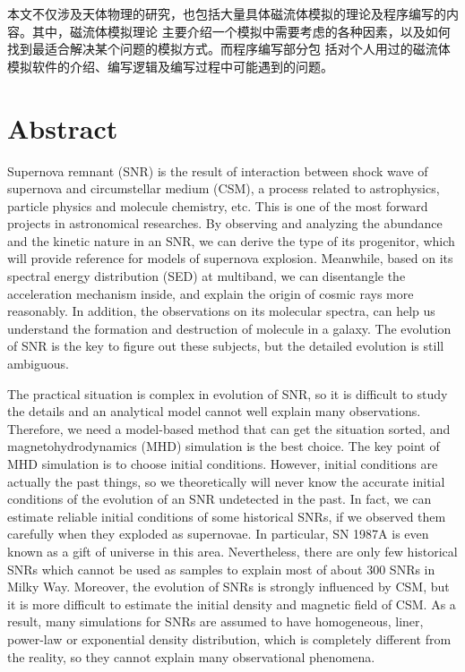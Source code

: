 本文不仅涉及天体物理的研究，也包括大量具体磁流体模拟的理论及程序编写的内容。其中，磁流体模拟理论
主要介绍一个模拟中需要考虑的各种因素，以及如何找到最适合解决某个问题的模拟方式。而程序编写部分包
括对个人用过的磁流体模拟软件的介绍、编写逻辑及编写过程中可能遇到的问题。

\chapter*{Abstract}%

Supernova remnant (SNR) is the result of interaction between shock wave of supernova
and circumstellar medium (CSM), a process related to astrophysics, particle physics and molecule
chemistry, etc.
This is one of the most forward projects in astronomical researches.
By observing and analyzing the abundance and the kinetic nature in an SNR, we can derive
the type of its progenitor, which will provide reference for models of supernova explosion.
Meanwhile, based on its spectral energy distribution (SED) at multiband, we can disentangle
the acceleration mechanism inside, and explain the origin of cosmic rays more reasonably.
In addition, the observations on its molecular spectra, can help us understand the formation
and destruction of molecule in a galaxy.
The evolution of SNR is the key to figure out these subjects, but the detailed evolution is
still ambiguous.

The practical situation is complex in evolution of SNR, so it is difficult to study the details
and an analytical model cannot well explain many observations.
Therefore, we need a model-based method that can get the situation sorted, and magnetohydrodynamics
(MHD) simulation is the best choice.
The key point of MHD simulation is to choose initial conditions.
However, initial conditions are actually the past things, so we theoretically will never know
the accurate initial conditions of the evolution of an SNR undetected in the past.
In fact, we can estimate reliable initial conditions of some historical SNRs, if we observed them
carefully when they exploded as supernovae.
In particular, SN 1987A is even known as a gift of universe in this area.
Nevertheless, there are only few historical SNRs which cannot be used as samples to explain
most of about 300 SNRs in Milky Way.
Moreover, the evolution of SNRs is strongly influenced by CSM, but it
is more difficult to estimate the initial density and magnetic field of CSM.
As a result, many simulations for SNRs are assumed to have homogeneous, liner, power-law or
exponential density distribution, which is completely different from the reality, so they
cannot explain many observational phenomena.

